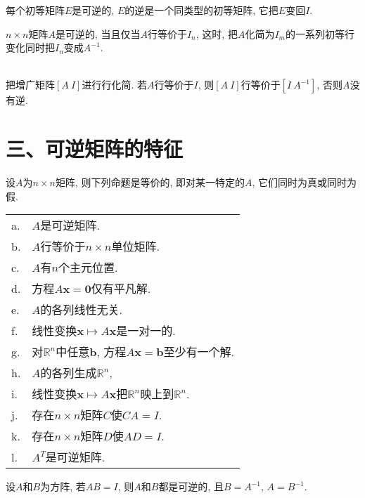 \begin{law}
每个初等矩阵$E$是可逆的, $E$的逆是一个同类型的初等矩阵, 它把$E$变回$I$.
\end{law}\vspace{4ex}

\begin{theorem}
$n\times n$矩阵$A$是可逆的, 当且仅当$A$行等价于$I_n$, 这时, 把$A$化简为$I_m$的一系列初等行变化同时把$I_n$变成$A^{-1}$.
\end{theorem}\vspace{4ex}

\begin{law}[求$A^{-1}$的算法]\ \\
把增广矩阵$[A\ I]$进行行化简. 若$A$行等价于$I$, 则$[A\ I]$行等价于$[I\ A^{-1}]$, 否则$A$没有逆.
\end{law}\vspace{8ex}

\section{三、可逆矩阵的特征}
\begin{theorem}[可逆矩阵定理]
设$A$为$n\times n$矩阵, 则下列命题是等价的, 即对某一特定的$A$, 它们同时为真或同时为假.\\
\begin{tabular}{l@{\ }l}
a. & $A$是可逆矩阵.\\
b. & $A$行等价于$n\times n$单位矩阵.\\
c. & $A$有$n$个主元位置.\\
d. & 方程$A\bm{x}=\bm{0}$仅有平凡解.\\
e. & $A$的各列线性无关.\\
f. & 线性变换$\bm{x}\mapsto A\bm{x}$是一对一的.\\
g. & 对$\mathbb{R}^n$中任意$\bm{b}$, 方程$A\bm{x}=\bm{b}$至少有一个解.\\
h. & $A$的各列生成$\mathbb{R}^n$,\\
i. & 线性变换$\bm{x}\mapsto A\bm{x}$把$\mathbb{R}^n$映上到$\mathbb{R}^n$.\\
j. & 存在$n\times n$矩阵$C$使$CA=I$.\\
k. & 存在$n\times n$矩阵$D$使$AD=I$.\\
l. & $A^T$是可逆矩阵.
\end{tabular}
\end{theorem}\vspace{4ex}

\begin{law}
设$A$和$B$为方阵, 若$AB=I$, 则$A$和$B$都是可逆的, 且$B=A^{-1}$, $A=B^{-1}$.
\end{law}\vspace{4ex}

